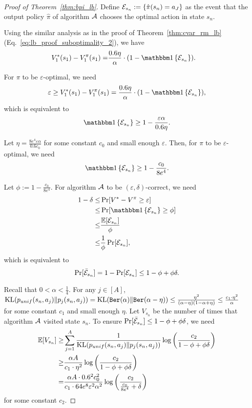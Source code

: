 \begin{proof}[Proof of Theorem~\ref{thm:bpi_lb}]
	Define $\mathcal{E}_{s_n}:=\{ \hat{\pi}(s_n)=a_J \}$ as the event that the output policy $\hat{\pi}$ of algorithm $\mathcal{A}$ chooses the optimal action in state $s_n$.
	
	Using the similar analysis as in the proof of Theorem~\ref{thm:cvar_rm_lb} (Eq.~\eqref{eq:lb_proof_suboptimality_2}), we have
	\begin{align*}
		V^{*}_1(s_1)-V^{\pi}_1(s_1) = & \frac{0.6\eta}{\alpha} \cdot  (1-\indicator{ \cE_{s_n} }) .
	\end{align*}
	
	For $\pi$ to be $\varepsilon$-optimal, we need
	\begin{align*}
		\varepsilon \geq V^{*}_1(s_1)-V^{\pi}_1(s_1) =  \frac{0.6\eta}{\alpha} \cdot  (1-\indicator{ \cE_{s_n} })  ,
	\end{align*}
	which is equivalent to
	\begin{align*}
		\indicator{ \cE_{s_n} } \geq 1- \frac{\varepsilon \alpha}{0.6 \eta} .
	\end{align*}
	
	Let $\eta=\frac{8 e^4 \varepsilon \alpha}{0.6c_0}$ for some constant $c_0$ and small enough $\varepsilon$. Then, for $\pi$ to be $\varepsilon$-optimal, we need
	\begin{align*}
		\indicator{ \cE_{s_n} } \geq 1-\frac{c_0}{8e^4} .
	\end{align*}
	
	Let $\phi:=1-\frac{c_0}{8e^4}$.
	For algorithm $\mathcal{A}$ to be $(\varepsilon,\delta)$-correct, we need
	\begin{align*}
		1-\delta \leq & \Pr[ V^{*}-V^{\pi} \geq \varepsilon]
		\\
		\leq & \Pr[\indicator{ \cE_{s_n} } \geq \phi]  
		\\
		\leq & \frac{\ex[\cE_{s_n}]}{\phi}
		\\
		\leq & \frac{1}{\phi} \Pr[\cE_{s_n}] ,
	\end{align*} 
	which is equivalent to
	\begin{align*}
		\Pr[\bar{\mathcal{E}}_{s_n}] = 1- \Pr[\mathcal{E}_{s_n}] \leq  1-\phi+\phi \delta .
	\end{align*}
	
	Recall that $0<\alpha<\frac{1}{4}$. For any $j \in [A]$, $\textup{KL}(p_{unif}(s_n,a_j)\|p_j(s_n,a_j)) = \textup{KL}(\mathtt{Ber}(\alpha)\|\mathtt{Ber}(\alpha-\eta)) \leq \frac{\eta^2}{(\alpha-\eta) (1-\alpha+\eta)} \leq \frac{c_1 \cdot \eta^2}{\alpha}$ for some constant $c_1$ and small enough $\eta$.
	Let $V_{s_n}$ be the number of times that algorithm $\mathcal{A}$ visited state $s_n$.
	To ensure $\Pr[\bar{\mathcal{E}}_{s_n}]  \leq 1-\phi+\phi \delta$, we need 
	\begin{align*}
		\mathbb{E}[V_{s_n}] \geq & \sum_{j=1}^{A} \frac{1}{\textup{KL}(p_{unif}(s_n,a_j)\|p_j(s_n,a_j))} \log \left( \frac{c_2}{1-\phi+\phi \delta} \right)
		\\
		\geq & \frac{\alpha A}{c_1 \cdot \eta^2} \log \left( \frac{c_2}{1-\phi+\phi \delta} \right)
		\\
		= & \frac{\alpha A \cdot 0.6^2 c_0^2 }{c_1 \cdot 64 e^8 \varepsilon^2 \alpha^2} \log \left( \frac{c_2}{\frac{c_0}{8e^4} + \delta} \right) 
	\end{align*}
	for some constant $c_2$.
	

\end{proof}
